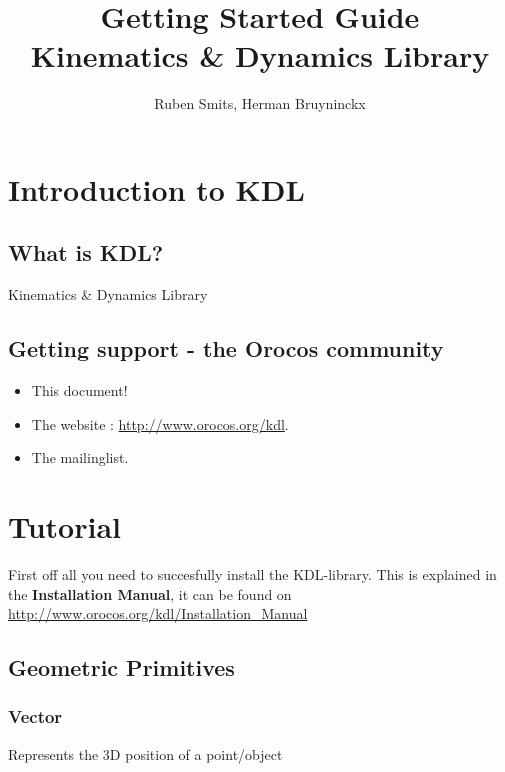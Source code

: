 \documentclass[a4paper,10pt]{report}
\title{Getting Started Guide \\ Kinematics \& Dynamics Library}
\author{Ruben Smits, Herman Bruyninckx}
\begin{document}
\maketitle

\chapter{Introduction to KDL}
\label{cha:introduction-kdl}

\section{What is KDL?}
\label{sec:what-kdl}
Kinematics \& Dynamics Library 


\section{Getting support - the Orocos community}
\label{sec:gett-supp-oroc}

\begin{itemize}
\item This document!
\item The website : \url{http://www.orocos.org/kdl}.
\item The mailinglist. 
\end{itemize}

\chapter{Tutorial}
\label{cha:tutorial}

First off all you need to succesfully install the KDL-library. This is
explained in the \textbf{Installation Manual}, it can be found on
\url{http://www.orocos.org/kdl/Installation_Manual}


\section{Geometric Primitives}
\label{sec:geometric-primitives}

\subsection{Vector}
\label{sec:vector}

Represents the 3D position of a point/object

\lstset{language=c++}

\end{document}
